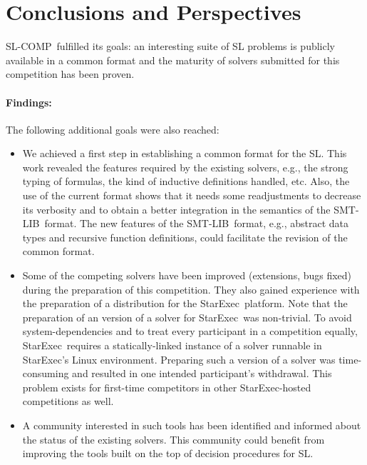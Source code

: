 \documentclass[twoside,11pt]{article}
\newcommand{\smtlib}{\textsf{SMT-LIB}}
\newcommand{\slcomp}{\textsf{SL-COMP}}
\newcommand{\starexec}{\textsf{StarExec}}
\begin{document}
\section{Conclusions and Perspectives}

\slcomp\ fulfilled its goals:
an interesting suite of SL problems is publicly available in a common format and
the maturity of solvers submitted for this competition has been proven.

\paragraph{Findings:}
The following additional goals were also reached:
\begin{itemize}
\item We achieved a first step in establishing a common format for the SL. 
This work revealed the features required by the existing solvers, e.g., the strong typing of formulas, the kind of inductive definitions handled, etc.
Also, the use of the current format shows that it needs some readjustments to decrease its verbosity and to obtain a better integration in the semantics of the \smtlib\ format. 
The new features of the \smtlib\ format, e.g., abstract data types and recursive function definitions, could facilitate the revision of the common format.

\item Some of the competing solvers have been improved (extensions, bugs fixed) during the preparation of this competition. They also gained experience with the preparation of a distribution for the \starexec\ platform. 
%
Note that the preparation of an version of a solver for \starexec\ was non-trivial. 
To avoid system-dependencies and to treat every participant in a competition equally, \starexec\ requires a 
statically-linked instance of a solver runnable in \starexec's Linux environment. Preparing such a version
of a solver was time-consuming and resulted in one intended participant's withdrawal. This problem
exists for first-time competitors in other \starexec-hosted competitions as well.

\item A community interested in such tools has been identified and informed about the status of the existing solvers.
This community could benefit from improving the tools built on the top of decision procedures for SL.


\end{itemize}
\end{document}
